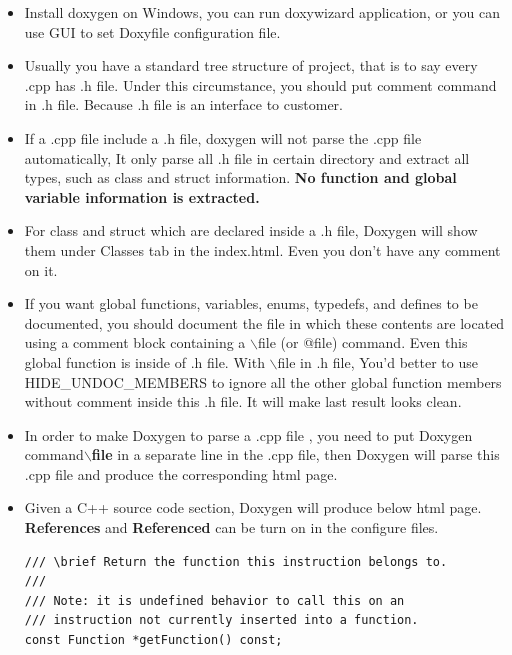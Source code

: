 \documentclass[a4paper,11pt,twoside]{book}
\begin{document}
\begin{itemize}
	\item Install doxygen on Windows, you can run doxywizard application, or you can use GUI to set Doxyfile configuration file.
	
	\item Usually you have a standard tree structure of project, that is to say every .cpp has .h file.  Under this circumstance, you should put comment command in .h file. Because .h file is an interface to customer.
	
	\item If a .cpp file include a .h file,  doxygen will not parse the .cpp file automatically, It only parse all .h file in certain directory and extract all types, such as class and struct information. \textbf{No function and global variable information is extracted.} 
	
	\item For class and struct which are declared inside a .h file, Doxygen will show them under Classes tab in the index.html. Even you don't have any comment on it.
	
	\item If you want global functions, variables, enums, typedefs, and defines to be documented, you should document the file in which these contents are located using a comment block containing a $\backslash$file (or @file) command. Even this global function is inside of .h file. With $\backslash$file in .h file, You'd better to use HIDE\_UNDOC\_MEMBERS to ignore all the other global function members without comment inside this .h file. It will make last result looks clean. 
	
	\item In order to make Doxygen to parse a .cpp file , you need to put Doxygen command\textbf{$\backslash$file} in a separate line in the .cpp file, then Doxygen will parse this .cpp file and produce the corresponding html page.
	
	\item Given a C++ source code section, Doxygen will produce below html page.  \textbf{References} and \textbf{Referenced} can be turn on in the configure files.
	
\begin{lstlisting}[numbers=none]
/// \brief Return the function this instruction belongs to.
///
/// Note: it is undefined behavior to call this on an
/// instruction not currently inserted into a function.
const Function *getFunction() const;
	\end{lstlisting}
	

\end{itemize}
\end{document}
